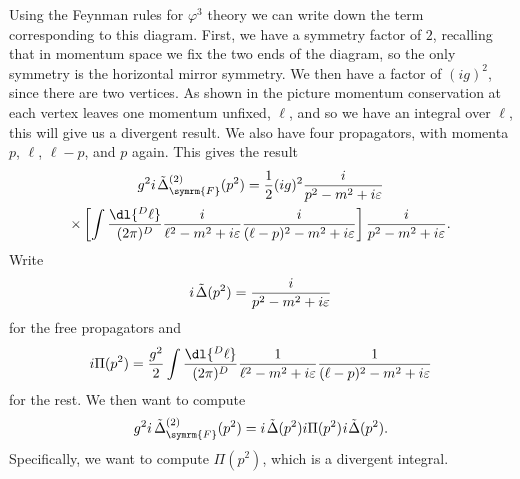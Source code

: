\documentclass[fleqn]{NotesClass}
\newcommand{\feynman}{\symrm{F}}
\begin{document}
    Using the Feynman rules for \(\varphi^3\) theory we can write down the term corresponding to this diagram.
    First, we have a symmetry factor of \(2\), recalling that in momentum space we fix the two ends of the diagram, so the only symmetry is the horizontal mirror symmetry.
    We then have a factor of \((ig)^2\), since there are two vertices.
    As shown in the picture momentum conservation at each vertex leaves one momentum unfixed, \(\ell\), and so we have an integral over \(\ell\), this will give us a divergent result.
    We also have four propagators, with momenta \(p\), \(\ell\), \(\ell - p\), and \(p\) again.
    This gives the result
    \begin{multline}
        g^2 i \mkern2mu \tilde{\Delta}_{\feynman}^{(2)}(p^2) = \frac{1}{2} (ig)^2 \frac{i}{p^2 - m^2 + i\varepsilon}\\
        \times \left[ \int \frac{\dl{^D\ell}}{(2\pi)^D} \frac{i}{\ell^2 - m^2 + i\varepsilon} \frac{i}{(\ell - p)^2 - m^2 + i\varepsilon} \right] \frac{i}{p^2 - m^2 + i\varepsilon}.
    \end{multline}
    Write
    \begin{equation}
        i \mkern2mu \tilde{\Delta}(p^2) = \frac{i}{p^2 - m^2 + i\varepsilon}
    \end{equation}
    for the free propagators and
    \begin{equation}
        i\Pi(p^2) = \frac{g^2}{2} \int \frac{\dl{^D\ell}}{(2\pi)^D} \frac{1}{\ell^2 - m^2 + i\varepsilon} \frac{1}{(\ell - p)^2 - m^2 + i\varepsilon}
    \end{equation}
    for the rest.
    We then want to compute
    \begin{equation}
        g^2 i \mkern3mu \tilde{\Delta}_{\feynman}^{(2)}(p^2) = i \mkern2mu \tilde{\Delta}(p^2) i\Pi(p^2) \mkern1mu i \mkern1mu \tilde{\Delta}(p^2).
    \end{equation}
    Specifically, we want to compute \(\Pi(p^2)\), which is a divergent integral.
    
\end{document}
